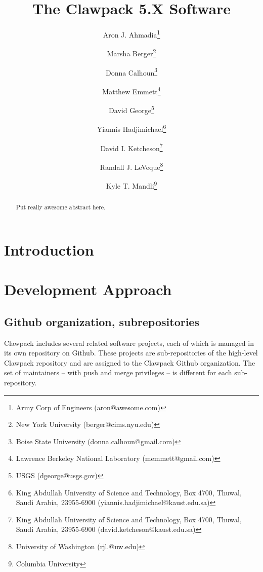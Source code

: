 \documentclass[]{siamltex}
\begin{document}
\ifpdf
{}
\else
{}
\fi

\title{The Clawpack 5.X Software}


\author{
        Aron J. Ahmadia\thanks{
            Army Corp of Engineers (\mbox{aron@awesome.com})} \and
        Marsha Berger\thanks{
            New York University (\mbox{berger@cims.nyu.edu})} \and
        Donna Calhoun\thanks{
            Boise State University (\mbox{donna.calhoun@gmail.com})} \and
        Matthew Emmett\thanks{
            Lawrence Berkeley National Laboratory (\mbox{memmett@gmail.com})} \and
        David George\thanks{
            USGS (\mbox{dgeorge@usgs.gov})} \and
        Yiannis Hadjimichael\thanks{
            King Abdullah University of Science and Technology, Box 4700, Thuwal, Saudi Arabia, 23955-6900 (\mbox{yiannis.hadjimichael@kaust.edu.sa})} \and
        David I. Ketcheson\thanks{
            King Abdullah University of Science and Technology, Box 4700, Thuwal, Saudi Arabia, 23955-6900 (\mbox{david.ketcheson@kaust.edu.sa})} \and
        Randall J. LeVeque\thanks{
            University of Washington (\mbox{rjl.@uw.edu})} \and
        Kyle T. Mandli\thanks{
            Columbia University}
        }

\maketitle

\begin{abstract}
    Put really awesome abstract here.
\end{abstract}

\section{Introduction}

\section{Development Approach}

\subsection{Github organization, subrepositories}
Clawpack includes several related software projects, each of which is managed in its own repository on Github.  These projects are sub-repositories of the high-level Clawpack repository and are assigned to the Clawpack Github organization.  The set of maintainers -- with push and merge privileges -- is different for each sub-repository.  
\end{document}
